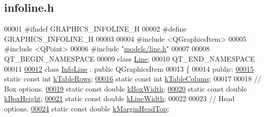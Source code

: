 \hypertarget{infoline_8h_source}{}\subsection{infoline.\+h}
\label{infoline_8h_source}

\begin{DoxyCode}
00001 \textcolor{preprocessor}{#ifndef GRAPHICS\_INFOLINE\_H}
00002 \textcolor{preprocessor}{#define GRAPHICS\_INFOLINE\_H}
00003 
00004 \textcolor{preprocessor}{#include <QGraphicsItem>}
00005 \textcolor{preprocessor}{#include <QPoint>}
00006 \textcolor{preprocessor}{#include "\hyperlink{line_8h}{models/line.h}"}
00007 
00008 QT\_BEGIN\_NAMESPACE
00009 \textcolor{keyword}{class }\hyperlink{class_line}{Line};
00010 QT\_END\_NAMESPACE
00011 
\hypertarget{infoline_8h_source_l00012}{}\hyperlink{class_info_line}{00012} \textcolor{keyword}{class }\hyperlink{class_info_line}{InfoLine} : \textcolor{keyword}{public} QGraphicsItem
00013 \{
00014 \textcolor{keyword}{public}:
\hypertarget{infoline_8h_source_l00015}{}\hyperlink{class_info_line_a95cdc7a95cde6db7c6faceda995d26b9}{00015}   \textcolor{keyword}{static} \textcolor{keyword}{const} \textcolor{keywordtype}{int} \hyperlink{class_info_line_a95cdc7a95cde6db7c6faceda995d26b9}{kTableRows};
\hypertarget{infoline_8h_source_l00016}{}\hyperlink{class_info_line_a9fc071b08eb913cf3afc623835ad2fd8}{00016}   \textcolor{keyword}{static} \textcolor{keyword}{const} \textcolor{keywordtype}{int} \hyperlink{class_info_line_a9fc071b08eb913cf3afc623835ad2fd8}{kTableColums};
00017 
00018   \textcolor{comment}{// Box options.}
\hypertarget{infoline_8h_source_l00019}{}\hyperlink{class_info_line_a33821aa140dc03829357d4006e9c153c}{00019}   \textcolor{keyword}{static} \textcolor{keyword}{const} \textcolor{keywordtype}{double} \hyperlink{class_info_line_a33821aa140dc03829357d4006e9c153c}{kBoxWidth};
\hypertarget{infoline_8h_source_l00020}{}\hyperlink{class_info_line_a9e459549795bab79ae3b6c184dc78a00}{00020}   \textcolor{keyword}{static} \textcolor{keyword}{const} \textcolor{keywordtype}{double} \hyperlink{class_info_line_a9e459549795bab79ae3b6c184dc78a00}{kBoxHeight};
\hypertarget{infoline_8h_source_l00021}{}\hyperlink{class_info_line_ad072bc8ef178113c36c3d480c7d637ac}{00021}   \textcolor{keyword}{static} \textcolor{keyword}{const} \textcolor{keywordtype}{double} \hyperlink{class_info_line_ad072bc8ef178113c36c3d480c7d637ac}{kLineWidth};
00022 
00023   \textcolor{comment}{// Head options.}
\hypertarget{infoline_8h_source_l00024}{}\hyperlink{class_info_line_a73e02db68396f0c4b66d0cf80bd37c83}{00024}   \textcolor{keyword}{static} \textcolor{keyword}{const} \textcolor{keywordtype}{double} \hyperlink{class_info_line_a73e02db68396f0c4b66d0cf80bd37c83}{kMarginHeadTop};

\end{DoxyCode}
